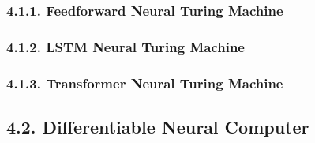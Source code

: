 \documentclass[
]{article}
\begin{document}
\hypertarget{feedforward-neural-turing-machine}{%
\subsubsection{4.1.1. Feedforward Neural Turing
Machine}\label{feedforward-neural-turing-machine}}

\hypertarget{lstm-neural-turing-machine}{%
\subsubsection{4.1.2. LSTM Neural Turing
Machine}\label{lstm-neural-turing-machine}}

\hypertarget{transformer-neural-turing-machine}{%
\subsubsection{4.1.3. Transformer Neural Turing
Machine}\label{transformer-neural-turing-machine}}

\hypertarget{differentiable-neural-computer}{%
\subsection{4.2. Differentiable Neural
Computer}\label{differentiable-neural-computer}}
\end{document}
